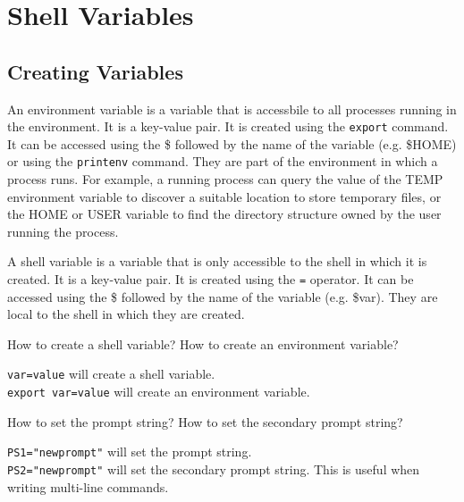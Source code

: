 \setchapterpreamble[u]{\margintoc}
\chapter{Shell Variables}

\section{Creating Variables}

\begin{definition}
  An environment variable is a variable that is accessbile to all
  processes running in the environment. It is a key-value pair.
  It is created using the \texttt{export} command. It can be accessed
  using the \$ followed by the name of the variable (e.g. \$HOME) or
  using the \texttt{printenv} command.
  They are part of the environment in which a process runs. For example,
  a running process can query the value of the
  TEMP environment variable to discover a suitable location to store
  temporary files, or the HOME or USER variable
  to find the directory structure owned by the user running the process.
\end{definition}

\begin{definition}
  A shell variable is a variable that is only accessible to the shell
  in which it is created. It is a key-value pair. It is created using
  the \texttt{=} operator. It can be accessed using the \$ followed by the name
  of the variable (e.g. \$var).
  They are local to the shell in which they are created.
\end{definition}

\begin{qs}
  How to create a shell variable? How to create an environment variable?
\end{qs}

\begin{ans}
  \texttt{var=value} will create a shell variable. \\
  \texttt{export var=value} will create an environment variable.
\end{ans}

\begin{qs}
  How to set the prompt string? How to set the secondary prompt string?
\end{qs}

\begin{ans}
  \texttt{PS1="newprompt"} will set the prompt string. \\
  \texttt{PS2="newprompt"} will set the secondary prompt string.
  This is useful when writing multi-line commands.
\end{ans}


